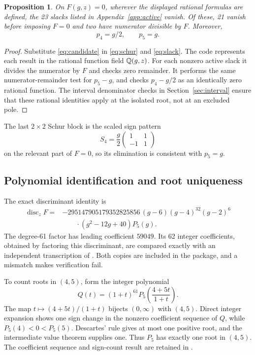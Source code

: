 \documentclass[11pt,letterpaper]{article}
\newtheorem{proposition}[theorem]{Proposition}
\newcommand{\code}[1]{\texttt{\detokenize{#1}}}
\begin{document}
\begin{proposition}\label{prop:family}
On $F(g,z)=0$, wherever the displayed rational formulas are defined, the 23 slacks listed in Appendix~\ref{app:active} vanish. Of these, 21 vanish before imposing $F=0$ and two have numerator divisible by $F$. Moreover,
\[
                  p_4=g/2,\qquad p_5=g.
\]
\end{proposition}
\begin{proof}
Substitute \eqref{eq:candidate} in \eqref{eq:schur} and \eqref{eq:slack}. The code represents each result in the rational function field $\mathbb Q(g,z)$. For each nonzero active slack it divides the numerator by $F$ and checks zero remainder. It performs the same numerator-remainder test for $p_5-g$, and checks $p_4-g/2$ as an identically zero rational function. The interval denominator checks in Section~\ref{sec:interval} ensure that these rational identities apply at the isolated root, not at an excluded pole.
\end{proof}
The last $2\times2$ Schur block is the scaled sign pattern
\[
              S_4=\frac g2\begin{pmatrix}1&1\\-1&1\end{pmatrix}
\]
on the relevant part of $F=0$, so its elimination is consistent with $p_5=g$.

\subsection{Polynomial identification and root uniqueness}
The exact discriminant identity is
\begin{equation}\label{eq:disc}
\begin{split}
 \operatorname{disc}_z F={}&-295147905179352825856\,
 (g-6)(g-4)^{32}(g-2)^6\\[-0.2em]
 &\hspace{2em}\cdot(g^2-12g+40)P_5(g).
\end{split}
\end{equation}
The degree-61 factor has leading coefficient $59049$. Its 62 integer coefficients, obtained by factoring this discriminant, are compared exactly with an independent transcription of \cite[Eq.~(2.15)]{ceu}. Both copies are included in the package, and a mismatch makes verification fail.

To count roots in $(4,5)$, form the integer polynomial
\[
 Q(t)=(1+t)^{61}P_5\!\left(\frac{4+5t}{1+t}\right).
\]
The map $t\mapsto(4+5t)/(1+t)$ bijects $(0,\infty)$ with $(4,5)$. Direct integer expansion shows one sign change in the nonzero coefficient sequence of $Q$, while $P_5(4)<0<P_5(5)$. Descartes' rule gives at most one positive root, and the intermediate value theorem supplies one. Thus $P_5$ has exactly one root in $(4,5)$. The coefficient sequence and sign-count result are retained in \code{results/algebra_certificate.json}.
\end{document}
